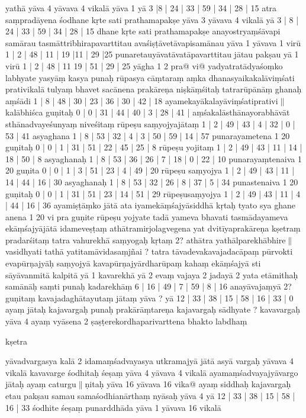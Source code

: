 \documentclass[10pt]{article}
\begin{document}
yathā yāva 4 yāvava 4 vikalā yāva 1 yā 3 |8 | 24 | 33 | 59 | 34 | 28 | 15 atra 
saṃpradāyena śodhane kṛte sati prathamapakṣe yāva 3  yāvava 4 vikalā yā 3 | 8 | 24 | 
33 | 59 | 34 | 28 | 15 dhane kṛte sati prathamapakṣe anayostryaṃśāvapi samārau 
tasmāttribhirapavarttitau avaśiṣṭāvetāvapisamānau yāva 1 yāvava 1 virū 1 | 2 | 48 | 11 | 
19 |11 | 29 |25
punaretauyāvatāvatāpavarttitau jātau pakṣau yā 1 virū 1 | 2 | 48 | 11 19 | 51 | 29 | 25 yāgha 1 2 pra@ vi@
yadyatratādyaśoṃko labhyate yasyāṃ kasya punaḥ rūpasya cāṃtaraṃ aṃka dhanasyaikakalāviṃśati prativikalā tulyaṃ bhavet 
 sacānena prakāreṇa niṣkāṃśitaḥ tatrarūpānāṃ ghanaḥ aṃśādi 1 | 8 | 48 | 30 | 23 | 36 | 30 | 42 | 18 ayamekayākalayāviṃśatiprativi$\|$ kalābhiśca guṇitaḥ 0 | 0 | 31 | 44 | 40 | 3 | 28 | 41 | aṃśakalāsthānayorabhāvāt sthānadvayeśunyaṃ niveśitaṃ 
 rūpeṣu saṃyojyajātaṃ 1 | 2 | 49 | 43 | 4 | 32 | 0 | 53 | 41 asyaghana 1 | 8 | 53 | 32 | 4 | 3 | 50 | 59 | 14 | 57 punarayametena 1 20 guṇitaḥ 0 | 0 | 1 | 31 | 51 | 22 | 45 | 25 | 8 rūpeṣu yojitaṃ 1 | 2 | 49 | 43 | 11 | 14 | 18 | 50 | 8 asyaghanaḥ 1 | 8 | 53 | 36 | 26 | 7 | 18 | 0 | 22 | 10 punarayaṃtenaiva 1 20 guṇita 0 | 0 | 1 | 3 | 51 | 23 | 4 | 49 | 20 rūpeṣu saṃyojya 1 | 2 | 49 | 43 | 11 | 14 | 44 | 16 | 30 asyaghanaḥ 1 | 8 | 53 | 32 | 26 | 8 | 37 | 5 | 34 punastenaiva 1 20 guṇitaḥ 0 | 0 | 1 | 31 | 51 | 23 | 14 | 51 | 29 
 rūpeṣusaṃyojya 1 | 2 | 49 | 43 | 11 | 4 | 44 | 16 | 36 ayamiṣṭāṃko jātā ata iyamekāṃśajyāsiddhā kṛtaḥ tyato sya ghane anena 1 20 vi pra 
 guṇite rūpeṣu yojyate tadā yameva bhavati tasmādayameva 
 ekāṃśajyājātā idameveṣṭaṃ athātramirjolagvegena 
 yat dvitīyaprakāreṇa kṣetraṃ pradarśitaṃ tatra vahurekhā saṃyogaḥ kṛtaṃ 2? athātra yathālparekhābhire$\|$
 vasidhyati tathā yatitamāvidasaṃjñai ? 
 tatra tāvadevakavajadacāpaṃ pūrvokti evapūrṇajyāḥ 
 saṃyojyā kavapūrṇajyārdharūpaṃ kahaṃ ekāṃśajyā sti 
sāyāvanmitā kalpitā yā 1 kavarekhā yā 2 evaṃ vajaya 2 jadayā 2 yata etāmithaḥ 
samānāḥ saṃti punaḥ kadarekhāṃ 6 | 16 | 49 | 7 | 59 | 8 | 16 anayāvajaṃyā 2? 
guṇitaṃ kavajadaghātayutaṃ jātaṃ yāva ? yā 12 | 33 | 38 | 15 | 58 | 16 | 33 | 0 ayaṃ 
jātaḥ kajavargaḥ punaḥ prakārāṃtareṇa kajavargaḥ sādhyate ? kavavargaḥ yāva 4 
ayaṃ vyāsena 2 ṣaṣṭerekordhaparivarttena bhakto labdhaṃ 
 
 kṣetra
 
yāvadvargasya kalā 2 idamaṃśadvayasya utkramajyā jātā asyā vargaḥ yāvava 4 
vikalā kavavarge śodhitaḥ śeṣaṃ yāva 4 yāvava 4 vikalā ayamaṃśadvayajyāvargo 
jātaḥ ayaṃ caturgu$\|$ṇitaḥ
 yāva 16 yāvava 16 vika@ ayaṃ 
siddhaḥ kajavargaḥ etau pakṣau samau samaśodhianārthaṃ nyāsaḥ yāva 4 yā 12 | 
33 | 38 | 15 | 58 | 16 | 33 śodhite śeṣaṃ punarddhāda
 yāva 1 yāvava 16 vikalā
 
\end{document}
